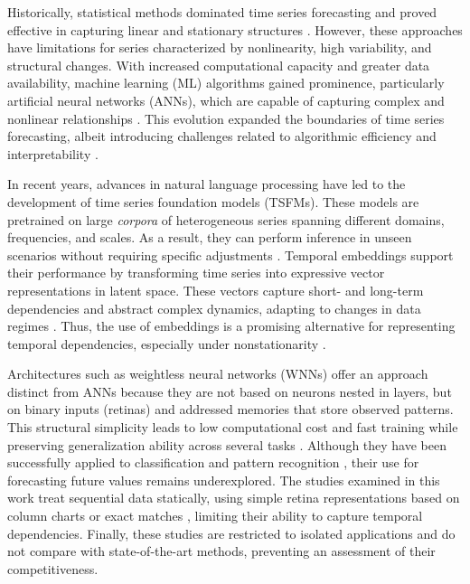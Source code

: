 \documentclass[final,3p,times,twocolumn,authoryear]{elsarticle}
\begin{document}
Historically, statistical methods dominated time series forecasting and proved effective in capturing linear and stationary structures \citep{box_time_2015, shumway_time_2017}. However, these approaches have limitations for series characterized by nonlinearity, high variability, and structural changes. With increased computational capacity and greater data availability, machine learning (ML) algorithms gained prominence, particularly artificial neural networks (ANNs), which are capable of capturing complex and nonlinear relationships \citep{haykin_neural_2009, hyndman_forecasting_2021}. This evolution expanded the boundaries of time series forecasting, albeit introducing challenges related to algorithmic efficiency and interpretability \citep{schmidhuber_deep_2015, makridakis_statistical_2018}.

In recent years, advances in natural language processing have led to the development of time series foundation models (TSFMs). These models are pretrained on large \textit{corpora} of heterogeneous series spanning different domains, frequencies, and scales. As a result, they can perform inference in unseen scenarios without requiring specific adjustments \citep{gruver_large_2023}. Temporal embeddings support their performance by transforming time series into expressive vector representations in latent space. These vectors capture short- and long-term dependencies and abstract complex dynamics, adapting to changes in data regimes \citep{trirat_universal_2026, irani_positional_2026}. Thus, the use of embeddings is a promising alternative for representing temporal dependencies, especially under nonstationarity \citep{lim_time_2021, trirat_universal_2026}.

Architectures such as weightless neural networks (WNNs) offer an approach distinct from ANNs because they are not based on neurons nested in layers, but on binary inputs (retinas) and addressed memories that store observed patterns. This structural simplicity leads to low computational cost and fast training while preserving generalization ability across several tasks \citep{aleksander_abrief_2009}. Although they have been successfully applied to classification and pattern recognition \citep{franca_advances_2014}, their use for forecasting future values remains underexplored. The studies examined in this work treat sequential data statically, using simple retina representations based on column charts \citep{desouza_fast_2011} or exact matches \citep{alhassan_using_2011}, limiting their ability to capture temporal dependencies. Finally, these studies are restricted to isolated applications and do not compare with state-of-the-art methods, preventing an assessment of their competitiveness.
\end{document}
